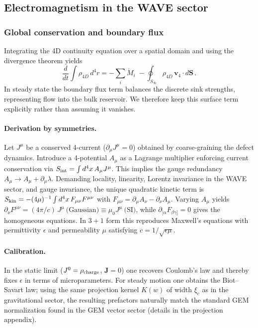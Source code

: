 \subsection{Electromagnetism in the WAVE sector}

\subsubsection{Global conservation and boundary flux}
Integrating the 4D continuity equation over a spatial domain and using the divergence theorem yields
\begin{equation}
\frac{d}{dt}\int \rho_{4D}\, d^4r = -\sum_i \dot M_i \;-
\oint_{S_\infty} \rho_{4D}\, \mathbf v_4\cdot d\mathbf S\,.
\end{equation}
In steady state the boundary flux term balances the discrete sink strengths, representing flow into the bulk reservoir. We therefore keep this surface term explicitly rather than assuming it vanishes.

\paragraph{Derivation by symmetries.} Let $J^\mu$ be a conserved 4-current ($\partial_\mu J^\mu=0$) obtained by coarse-graining the defect dynamics. Introduce a 4-potential $A_\mu$ as a Lagrange multiplier enforcing current conservation via $S_{\rm int}=\int d^4x\, A_\mu J^\mu$. This implies the gauge redundancy $A_\mu\to A_\mu+\partial_\mu\lambda$. Demanding locality, linearity, Lorentz invariance in the WAVE sector, and gauge invariance, the unique quadratic kinetic term is $S_{\rm kin}=-(4\mu)^{-1}\int d^4x\, F_{\mu\nu}F^{\mu\nu}$ with $F_{\mu\nu}=\partial_\mu A_\nu-\partial_\nu A_\mu$. Varying $A_\mu$ yields $\partial_\nu F^{\mu\nu} = (4\pi/c)\, J^\mu\ \text{(Gaussian)}\equiv \mu_0 J^\mu\ \text{(SI)}$, while $\partial_{[\alpha}F_{\beta\gamma]}=0$ gives the homogeneous equations. In $3{+}1$ form this reproduces Maxwell's equations with permittivity $\epsilon$ and permeability $\mu$ satisfying $c=1/\sqrt{\epsilon\mu}$.

\paragraph{Calibration.} In the static limit ($J^0=\rho_{\rm charge}$, $\mathbf J=0$) one recovers Coulomb's law and thereby fixes $\epsilon$ in terms of microparameters. For steady motion one obtains the Biot--Savart law; using the same projection kernel $K(w)$ of width $\xi_c$ as in the gravitational sector, the resulting prefactors naturally match the standard GEM normalization found in the GEM vector sector (details in the projection appendix).


